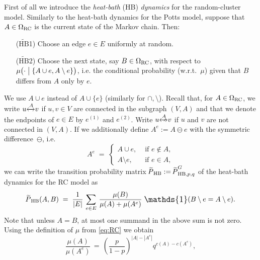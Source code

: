 \documentclass{dis}
\theoremstyle{citing}
\begin{document}
First of all we introduce the 
\emph{heat-bath} (HB) \emph{dynamics}
for the random-cluster model. 
Similarly to the heat-bath dynamics for the Potts model, 
suppose that $A\in{{\Omega}_{\rm RC}}$ is the current state of the Markov chain. 
Then:
\begin{itemize}
	\item[(${\widetilde{{\text{HB}}}}$1)] 
						Choose an edge $e\in E$ uniformly at random.
	\item[(${\widetilde{{\text{HB}}}}$2)] 
						Choose the next state, 
						say $B\in{{\Omega}_{\rm RC}}$, with respect to 
						$\mu\bigl(\cdot\bigm|\{A\cup e, A\setminus e\}\bigr)$, 
						i.e. the conditional probability (w.r.t.~$\mu$) 
						given that $B$ differs from $A$ only by $e$.
\end{itemize}
We use $A\cup e$ instead of $A\cup\{e\}$ 
(similarly for $\cap,\setminus$).
Recall that, for $A\in{{\Omega}_{\rm RC}}$, 
we write $u{\xleftrightarrow{{A}}} v$ if $u,v\in V$ are connected in 
the subgraph $(V,A)$ and that we denote the endpoints of 
$e\in E$ by $e^{(1)}$ and $e^{(2)}$.
Write $u{\longarrownot\xleftrightarrow{{A}}} v$ 
if $u$ and $v$ are 
not connected in $(V,A)$. 
If we additionally define $A^e:=A\ominus e$ with the symmetric 
difference~$\ominus$, i.e.
\begin{equation} \label{eq:RC-Ae}
A^e \;=\; \begin{cases}
A\cup e, & \text{ if } e\notin A, \\
A\setminus e, & \text{ if } e\in A,
\end{cases}
\end{equation}
we can write 
the transition probability matrix ${{\raisebox{2pt}{ ${\widetilde{{}}}$ }\mkern-14mu P}_{\rm HB}}:={\raisebox{2pt}{ ${\widetilde{{}}}$ }\mkern-14mu P}_{{\rm HB},p,q}^G$ of the 
heat-bath dynamics for the RC model as
\begin{equation}\label{eq:RC-HB-def}
{{\raisebox{2pt}{ ${\widetilde{{}}}$ }\mkern-14mu P}_{\rm HB}}(A,B) \;=\; \frac1{{\left\vert {E} \right\vert}}\,\sum_{e\in E}\,
\frac{\mu(B)}{\mu(A)+\mu(A^e)}\;{\scalebox{1.2}{\raisebox{-0.2mm}{$\mathds{1}$}}}(B\setminus e = A\setminus e).
\end{equation}
Note that unless $A=B$, at most one summand in the above sum is not zero. 
Using the definition of $\mu$ from \eqref{eq:RC} we obtain 
\begin{equation} \label{eq:RC-quotient}
\frac{\mu(A)}{\mu(A^e)}\,=\,\left(\frac{p}{1-p}\right)^{{\left\vert {A} \right\vert}-{\left\vert {A^e} \right\vert}} 
	q^{c(A)-c(A^e)},
\end{equation}
\end{document}
